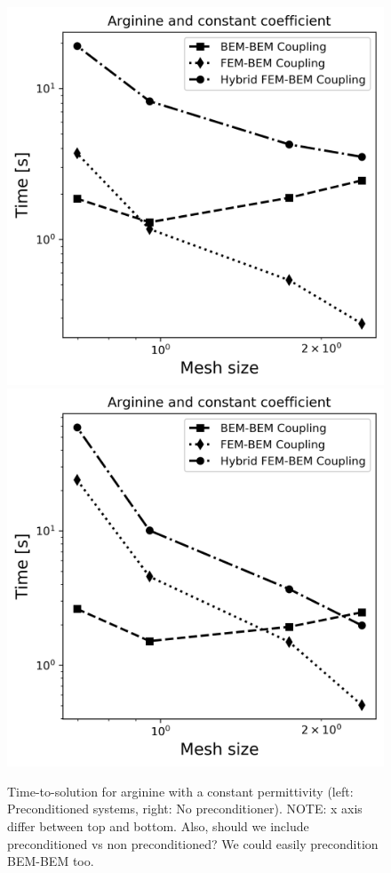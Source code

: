 \begin{figure}
\centering
  \includegraphics[width=0.45\linewidth]{Arginine_const_coeff_time.png}
  \includegraphics[width=0.45\linewidth]{No_prec_Arginine_const_coeff_time.png}
\caption{Time-to-solution for arginine with a constant permittivity (left: Preconditioned systems, right: No preconditioner). NOTE: x axis differ between top and bottom. Also, should we include preconditioned vs non preconditioned? We could easily precondition BEM-BEM too.  %
}
\label{fig:arg_constant_time}
\end{figure}



